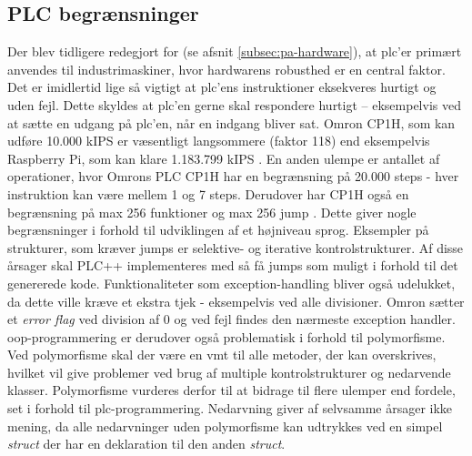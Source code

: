 \subsection{PLC begrænsninger}\label{sec:plcprob}
Der blev tidligere redegjort for (se afsnit \ref{subsec:pa-hardware}), at \gls{plc}'er primært anvendes til industrimaskiner, hvor hardwarens robusthed er en central faktor. Det er imidlertid lige så vigtigt at \gls{plc}'ens instruktioner eksekveres hurtigt og uden fejl. Dette skyldes at \gls{plc}'en gerne skal respondere hurtigt – eksempelvis ved at sætte en udgang på \gls{plc}'en, når en indgang bliver sat. 
Omron CP1H, som kan udføre 10.000 kIPS er væsentligt langsommere (faktor 118) end eksempelvis Raspberry Pi, som kan klare 1.183.799 kIPS \cite{raspBench}. En anden ulempe er antallet af operationer, hvor Omrons PLC CP1H har en begrænsning på 20.000 steps - hver instruktion kan være mellem 1 og 7 steps. Derudover har CP1H også en begrænsning på max 256 funktioner og max 256 jump  \cite{cp1h}. Dette giver nogle begrænsninger i forhold til udviklingen af et højniveau sprog. Eksempler på strukturer, som kræver jumps er selektive- og iterative kontrolstrukturer. Af disse årsager skal PLC++ implementeres med så få jumps som muligt i forhold til det genererede kode. Funktionaliteter som exception-handling bliver også udelukket, da dette ville kræve et ekstra tjek - eksempelvis ved alle divisioner. Omron sætter et \textit{error flag} ved division af 0 og ved fejl findes den nærmeste exception handler. \cite{exceptionHandling}\\





\noindent \gls{oop}-programmering er derudover også problematisk i forhold til polymorfisme. Ved polymorfisme skal der være en \gls{vmt} til alle metoder, der kan overskrives, hvilket vil give problemer ved brug af multiple kontrolstrukturer og nedarvende klasser. Polymorfisme vurderes derfor 
til at bidrage til flere ulemper end fordele, set i forhold til \gls{plc}-programmering. Nedarvning giver af selvsamme årsager ikke mening, da alle nedarvninger uden polymorfisme kan udtrykkes ved en simpel \textit{struct} der har en deklaration til den anden \textit{struct}. \cite{Sebesta_2013}\\ 


